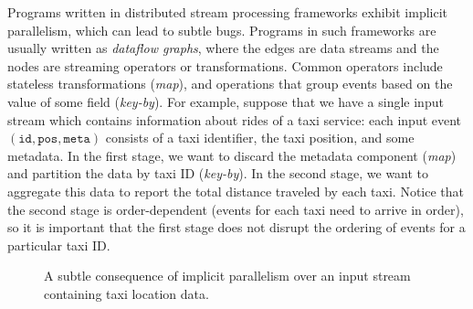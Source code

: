 Programs written in distributed stream processing frameworks exhibit implicit parallelism, which can lead to subtle bugs. Programs in such frameworks are usually written as \emph{dataflow graphs}, where the edges are data streams and the nodes are streaming operators or transformations.
Common operators include stateless transformations (\emph{map}), and operations that group events based on the value of some field (\emph{key-by}).
For example, suppose that we have a single input stream which contains information about rides of a taxi service: each input event $(\texttt{id}, \texttt{pos}, \texttt{meta})$ consists of a taxi identifier, the taxi position, and some metadata. In the first stage, we want to discard the metadata component (\emph{map}) and partition the data by taxi ID (\emph{key-by}). In the second stage, we want to aggregate this data to report the total distance traveled by each taxi. Notice that the second stage is order-dependent (events for each taxi need to arrive in order), so it is important that the first stage does not disrupt the ordering of events for a particular taxi ID.

\begin{figure}[tb]
\centering
{}

\smallskip


\caption[DiffStream example use case 1.]{A subtle consequence of implicit parallelism
over an input stream containing taxi location data.
}
\label{diffstream:ex:overview-simple}
\end{figure}

